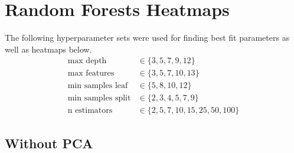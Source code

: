 \documentclass[a4paper]{article}
\begin{document}

\section{Random Forests Heatmaps} \label{app:rf_heatmaps}
The following hyperparameter sets were used for finding best fit parameters as well as heatmaps below.
\begin{align*}
	\text{max depth} &\in \{3, 5, 7, 9, 12\}\\
	\text{max features} &\in \{3, 5, 7, 10, 13\}\\
	\text{min samples leaf} &\in \{5, 8, 10, 12\}\\
	\text{min samples split} &\in \{2, 3, 4, 5, 7, 9\}\\
	\text{n estimators} &\in \{2, 5, 7, 10, 15, 25, 50, 100\}
\end{align*}

\subsection{Without PCA}
\end{document}
